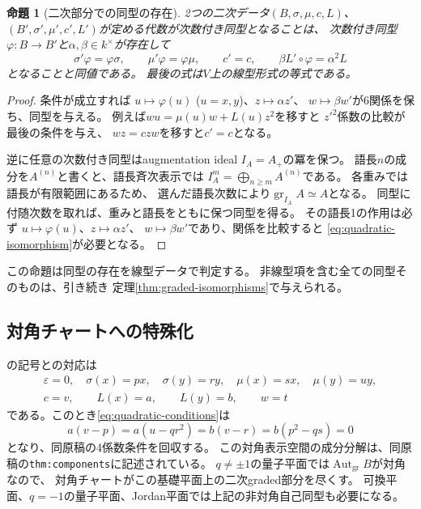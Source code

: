 \documentclass[11pt,a4paper]{ltjsarticle}
\newtheorem{proposition}[theorem]{命題}
\theoremstyle{definition}
\newcommand{\Aut}{\operatorname{Aut}}
\newcommand{\gr}{\operatorname{gr}}
\begin{document}
\begin{proposition}[二次部分での同型の存在]\label{prop:quadratic-isomorphisms}
2つの二次データ$(B,\sigma,\mu,c,L)$、
$(B',\sigma',\mu',c',L')$が定める代数が次数付き同型となることは、
次数付き同型$\varphi:B\to B'$と$\alpha,\beta\in k^\times$が存在して
\begin{equation}\label{eq:quadratic-isomorphism}
\sigma'\varphi=\varphi\sigma,\qquad
\mu'\varphi=\varphi\mu,\qquad
c'=c,\qquad
\beta L'\circ\varphi=\alpha^2L
\end{equation}
となることと同値である。
最後の式は$V$上の線型形式の等式である。
\end{proposition}
\begin{proof}
条件が成立すれば
$u\mapsto\varphi(u)$ ($u=x,y$)、$z\mapsto\alpha z'$、
$w\mapsto\beta w'$が6関係を保ち、同型を与える。
例えば$wu=\mu(u)w+L(u)z^2$を移すと
$z'^2$係数の比較が最後の条件を与え、
$wz=czw$を移すと$c'=c$となる。

逆に任意の次数付き同型はaugmentation ideal $I_A=A_+$の冪を保つ。
語長$n$の成分を$A^{(n)}$と書くと、語長斉次表示では
$I_A^m=\bigoplus_{n\geq m}A^{(n)}$である。
各重みでは語長が有限範囲にあるため、
選んだ語長次数により$\gr_{I_A}A\simeq A$となる。
同型に付随次数を取れば、重みと語長をともに保つ同型を得る。
その語長1の作用は必ず
$u\mapsto\varphi(u)$、$z\mapsto\alpha z'$、
$w\mapsto\beta w'$であり、関係を比較すると
\eqref{eq:quadratic-isomorphism}が必要となる。
\end{proof}

この命題は同型の存在を線型データで判定する。
非線型項を含む全ての同型そのものは、引き続き
定理\ref{thm:graded-isomorphisms}で与えられる。

\subsection{対角チャートへの特殊化}
の記号との対応は
\[
\begin{gathered}
\varepsilon=0,\quad \sigma(x)=px,\quad \sigma(y)=ry,\quad
\mu(x)=sx,\quad \mu(y)=uy,\\
c=v,\qquad L(x)=a,\qquad L(y)=b,\qquad w=t
\end{gathered}
\]
である。このとき\eqref{eq:quadratic-conditions}は
\[
a(v-p)=a(u-qr^2)=b(v-r)=b(p^2-qs)=0
\]
となり、同原稿の4係数条件を回収する。
この対角表示空間の成分分解は、同原稿の\texttt{thm:components}に記述されている。
$q\ne\pm1$の量子平面では$\Aut_{\mathrm{gr}}B$が対角なので、
対角チャートがこの基礎平面上の二次graded部分を尽くす。
可換平面、$q=-1$の量子平面、Jordan平面では上記の非対角自己同型も必要になる。
\end{document}
